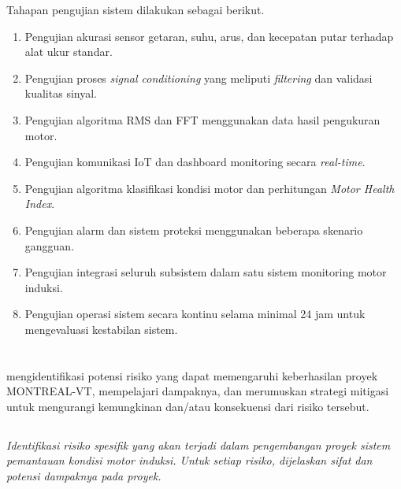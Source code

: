 \documentclass{elsinta}
\begin{document}
Tahapan pengujian sistem dilakukan sebagai berikut.

\begin{enumerate}
\item Pengujian akurasi sensor getaran, suhu, arus, dan kecepatan putar terhadap alat ukur standar.
\item Pengujian proses \textit{signal conditioning} yang meliputi \textit{filtering} dan validasi kualitas sinyal.
\item Pengujian algoritma RMS dan FFT menggunakan data hasil pengukuran motor.
\item Pengujian komunikasi IoT dan dashboard monitoring secara \textit{real-time}.
\item Pengujian algoritma klasifikasi kondisi motor dan perhitungan \textit{Motor Health Index}.
\item Pengujian alarm dan sistem proteksi menggunakan beberapa skenario gangguan.
\item Pengujian integrasi seluruh subsistem dalam satu sistem monitoring motor induksi.
\item Pengujian operasi sistem secara kontinu selama minimal 24 jam untuk mengevaluasi kestabilan sistem.
\end{enumerate} 
\section{\RiskAssessmentTitle}

mengidentifikasi potensi risiko yang dapat memengaruhi keberhasilan proyek MONTREAL-VT, mempelajari dampaknya, dan merumuskan strategi mitigasi untuk mengurangi kemungkinan dan/atau konsekuensi dari risiko tersebut.

\subsection{\TechFinancialRiskTitle}
\textit{Identifikasi risiko spesifik yang akan terjadi dalam pengembangan proyek sistem pemantauan kondisi motor induksi. Untuk setiap risiko, dijelaskan sifat dan potensi dampaknya pada proyek. }
\end{document}
